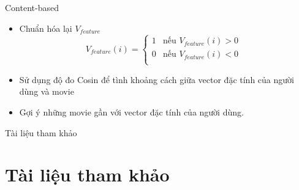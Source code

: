 \documentclass{beamer}
\newcommand{\bi}{\begin{itemize}}
\newcommand{\ei}{\end{itemize}}
\begin{document}
\begin{frame}{Content-based}
\bi
\item Chuẩn hóa lại $V_{feature}$
\begin{displaymath}
V_{feature}(i) = \left\{ \begin{array}{ll}
1 & \textrm{nếu  $V_{feature}(i) > 0$}\\
0 & \textrm{nếu  $V_{feature}(i) < 0$ }\\
\end{array} \right.
\end{displaymath}
\item Sử dụng độ đo Cosin để tình khoảng cách giữa vector đặc tính của người dùng và movie
\item Gợi ý những movie gần với vector đặc tính của người dùng.
\ei
\end{frame}
\begin{frame}{Tài liệu tham khảo}
\section*{Tài liệu tham khảo}
\end{frame}
\end{document}
